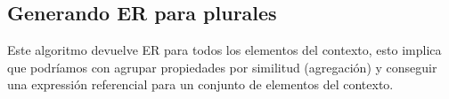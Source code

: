 \subsection{Generando ER para plurales}

Este algoritmo devuelve ER para todos los elementos del contexto, esto implica que podr\'iamos con agrupar propiedades por similitud (agregaci\'on) y conseguir una expressi\'on referencial para un conjunto de elementos del contexto.





